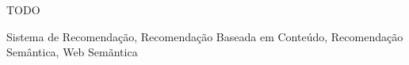 TODO

\begin{keywords}
	Sistema de Recomendação, Recomendação Baseada em Conteúdo, Recomendação Semântica, Web Semãntica
\end{keywords}